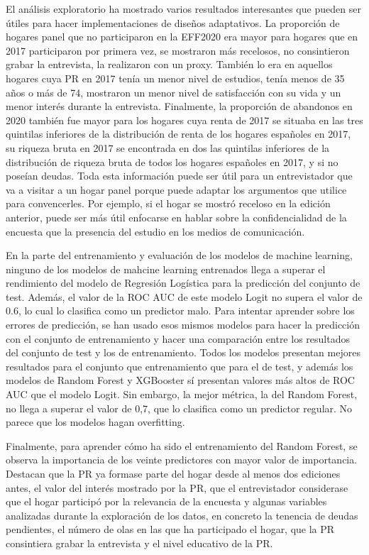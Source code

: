 El análisis exploratorio ha mostrado varios resultados interesantes que pueden ser útiles para hacer implementaciones de diseños adaptativos. La proporción de hogares panel que no participaron en la EFF2020 era mayor para hogares que en 2017 participaron por primera vez, se mostraron más recelosos, no consintieron grabar la entrevista, la realizaron con un proxy. También lo era en aquellos hogares cuya PR en 2017 tenía un menor nivel de estudios, tenía menos de 35 años o más de 74, mostraron un menor nivel de satisfacción con su vida y un menor interés durante la entrevista. Finalmente, la proporción de abandonos en 2020 también fue mayor para los hogares cuya renta de 2017 se situaba en las tres quintilas inferiores de la distribución de renta de los hogares españoles en 2017, su riqueza bruta en 2017 se encontrada en dos las quintilas inferiores de la distribución de riqueza bruta de todos los hogares españoles en 2017, y si no poseían deudas. Toda esta información puede ser útil para un entrevistador que va a visitar a un hogar panel porque puede adaptar los argumentos que utilice para convencerles. Por ejemplo, si el hogar se mostró receloso en la edición anterior, puede ser más útil enfocarse en hablar sobre la confidencialidad de la encuesta que la presencia del estudio en los medios de comunicación.

En la parte del entrenamiento y evaluación de los modelos de machine learning, ninguno de los modelos de mahcine learning entrenados llega a superar el rendimiento del modelo de Regresión Logística para la predicción del conjunto de test. Además, el valor de la ROC AUC de este modelo Logit no supera el valor de 0.6, lo cual lo clasifica como un predictor malo. Para intentar aprender sobre los errores de predicción, se han usado esos mismos modelos para hacer la predicción con el conjunto de entrenamiento y hacer una comparación entre los resultados del conjunto de test y los de entrenamiento. Todos los modelos presentan mejores resultados para el conjunto que entrenamiento que para el de test, y además los modelos de Random Forest y XGBooster sí presentan valores más altos de ROC AUC que el modelo Logit. Sin embargo, la mejor métrica, la del Random Forest, no llega a superar el valor de 0,7, que lo clasifica como un predictor regular. No parece que los modelos hagan overfitting.

Finalmente, para aprender cómo ha sido el entrenamiento del Random Forest, se observa la importancia de los veinte predictores con mayor valor de importancia. Destacan que la PR ya formase parte del hogar desde al menos dos ediciones antes, el valor del interés mostrado por la PR, que el entrevistador considerase que el hogar participó por la relevancia de la encuesta y algunas variables analizadas durante la exploración de los datos, en concreto la tenencia de deudas pendientes, el número de olas en las que ha participado el hogar, que la PR consintiera grabar la entrevista y el nivel educativo de la PR.

